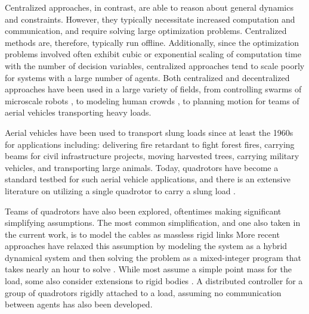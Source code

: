 \documentclass[../root.tex]{subfiles}
\begin{document}
Centralized approaches, in contrast, are able to reason about general
dynamics and constraints. However, they typically necessitate increased
computation and communication, and require solving large optimization
problems. Centralized methods are, therefore, typically run offline.
Additionally, since the optimization problems involved often exhibit cubic or
exponential scaling of computation time with the number of decision
variables, centralized approaches tend to scale poorly for systems with a
large number of agents. Both centralized and decentralized approaches have
been used in a large variety of fields, from controlling swarms of microscale
robots \cite{woern_iswarm_2006}, to modeling human crowds \cite{bera_Realtime_2014},
to planning motion for teams of aerial vehicles
transporting heavy loads.

Aerial vehicles have been used to transport slung loads since at least the
1960s \cite{lancashire_Investigation_1966} for applications including:
delivering fire retardant to fight forest fires, carrying beams for civil
infrastructure projects, moving harvested trees, carrying military vehicles,
and transporting large animals. Today, quadrotors have become a standard
testbed for such aerial vehicle applications, and there is an extensive
literature on utilizing a single quadrotor to carry a slung load
\cite{sreenath_Geometric_2013,tang_Mixed_2015,decrousaz_Aggressive_2014,foehn_Fast_2017}.

Teams of quadrotors have also been explored, oftentimes making significant
simplifying assumptions. The most common simplification, and one also taken
in the current work, is to model the cables as massless rigid links
\cite{michael_Cooperative_2011,bernard_Autonomous_2011,tang_Aggressive_2018,lee_Geometric_2013,lee_Geometric_2014}
More recent approaches have relaxed this
assumption by modeling the system as a hybrid dynamical system and then
solving the problem as a mixed-integer program that takes nearly an hour to
solve \cite{tang_Mixed_2015}. While most assume a simple point mass for the
load, some also consider extensions to rigid bodies
\cite{michael_Cooperative_2011,lee_Geometric_2014}. 
A distributed controller for
a group of quadrotors rigidly attached to a load, assuming no communication
between agents \cite{wang_Cooperative_2018} has also been developed.
\end{document}
